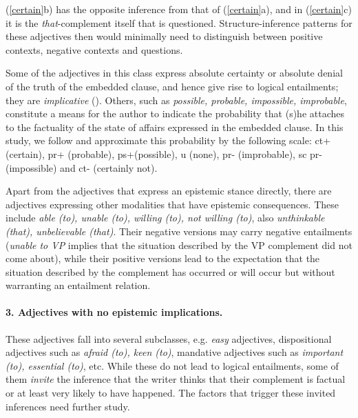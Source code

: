 \documentclass[10pt]{article}
\begin{document}
\vspace{-0.5em}
 \vspace{-0.5em} 
(\ref{certain}b) has the opposite inference from that of
 (\ref{certain}a), and 
in (\ref{certain}c) it is the
 \textit{that}-complement itself that is questioned. 
Structure-inference patterns for these adjectives
 then would minimally need to distinguish between positive contexts, negative
 contexts and questions.


Some of the adjectives in this class express absolute certainty or absolute denial of the truth of the embedded clause, and hence give rise to logical entailments; they are \textit{implicative} (\cite{karttunen:1971}). Others, such as \textit{possible, probable, impossible, improbable}, 
constitute a means for the author  to indicate the probability that (s)he attaches to the factuality of the state of affairs expressed in the embedded clause. In this study, we follow \cite{sauri:2008phd} and approximate this probability by the following scale: {\sc ct}+ (certain), {\sc pr}+ (probable), {\sc ps}+(possible), {\sc u} (none), {\sc pr}- (improbable), {sc pr}- (impossible) and {\sc ct}- (certainly not).

Apart from the adjectives that express an epistemic stance directly, there are adjectives expressing other modalities that have epistemic consequences. These include \textit{able (to), unable (to), willing (to), not willing (to)}, also \textit{unthinkable (that), unbelievable (that)}. Their negative versions may carry negative entailments (\textit{unable to VP} implies that the situation 
described  by the VP complement did not come about), while their positive versions lead to the expectation that the situation described by the complement has occurred or will occur but without warranting an entailment relation.

\vspace{-.2in}
\paragraph{3. Adjectives with no epistemic implications.}
These adjectives fall into several subclasses, e.g. \textit{easy} adjectives, dispositional adjectives such as \textit{afraid (to), keen (to)}, mandative adjectives such as \textit{important (to), essential (to)}, etc. While these do not lead to logical entailments, some of them \textit{invite} the inference that the writer thinks that their complement is factual or at least very likely to have happened. The factors that trigger these invited inferences need further study.
\end{document}
